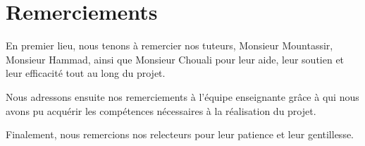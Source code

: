 \chapter*{Remerciements}

En premier lieu, nous tenons {\`a} remercier nos tuteurs, Monsieur Mountassir, Monsieur Hammad, ainsi que Monsieur Chouali pour leur aide, leur soutien et leur efficacit{\'e} tout au long du projet.

Nous adressons ensuite nos remerciements {\`a} l'{\'e}quipe enseignante gr{\^a}ce {\`a} qui nous avons pu acqu{\'e}rir les comp{\'e}tences n{\'e}cessaires {\`a} la r{\'e}alisation du projet.

Finalement, nous remercions nos relecteurs pour leur patience et leur gentillesse.


\clearpage
